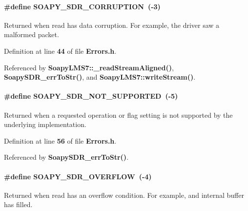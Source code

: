 \paragraph[{S\+O\+A\+P\+Y\+\_\+\+S\+D\+R\+\_\+\+C\+O\+R\+R\+U\+P\+T\+I\+ON}]{\setlength{\rightskip}{0pt plus 5cm}\#define S\+O\+A\+P\+Y\+\_\+\+S\+D\+R\+\_\+\+C\+O\+R\+R\+U\+P\+T\+I\+ON~(-\/3)}\label{Errors_8h_ac110bee1e7e9ceafd94e5ccc11b9c3bc}
Returned when read has data corruption. For example, the driver saw a malformed packet. 

Definition at line {\bf 44} of file {\bf Errors.\+h}.



Referenced by {\bf Soapy\+L\+M\+S7\+::\+\_\+read\+Stream\+Aligned()}, {\bf Soapy\+S\+D\+R\+\_\+err\+To\+Str()}, and {\bf Soapy\+L\+M\+S7\+::write\+Stream()}.

\paragraph[{S\+O\+A\+P\+Y\+\_\+\+S\+D\+R\+\_\+\+N\+O\+T\+\_\+\+S\+U\+P\+P\+O\+R\+T\+ED}]{\setlength{\rightskip}{0pt plus 5cm}\#define S\+O\+A\+P\+Y\+\_\+\+S\+D\+R\+\_\+\+N\+O\+T\+\_\+\+S\+U\+P\+P\+O\+R\+T\+ED~(-\/5)}\label{Errors_8h_ab087934e9ae9087a5629a325ce40c523}
Returned when a requested operation or flag setting is not supported by the underlying implementation. 

Definition at line {\bf 56} of file {\bf Errors.\+h}.



Referenced by {\bf Soapy\+S\+D\+R\+\_\+err\+To\+Str()}.

\paragraph[{S\+O\+A\+P\+Y\+\_\+\+S\+D\+R\+\_\+\+O\+V\+E\+R\+F\+L\+OW}]{\setlength{\rightskip}{0pt plus 5cm}\#define S\+O\+A\+P\+Y\+\_\+\+S\+D\+R\+\_\+\+O\+V\+E\+R\+F\+L\+OW~(-\/4)}\label{Errors_8h_aee161b45a89d4335be3376eae4a27a53}
Returned when read has an overflow condition. For example, and internal buffer has filled. 

